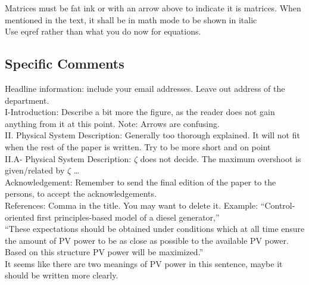 \noindent Matrices must be fat ink or with an arrow above to indicate it is matrices.
When mentioned in the text, it shall be in math mode to be shown in italic \\


\noindent Use eqref rather than what you do now for equations. \\



\subsection{Specific Comments}

\noindent Headline information: include your email addresses.
Leave out address of the department. \\


\noindent I-Introduction: Describe a bit more the figure, as the reader does not gain anything from it at this point. Note: Arrows are confusing. \\


\noindent II. Physical System Description: Generally too thorough explained. It will not fit when the rest of the paper is written. Try to be more short and on point \\


\noindent II.A- Physical System Description: $\zeta$ does not decide. The maximum overshoot is given/related by $\zeta$ … \\


\noindent Acknowledgement: Remember to send the final edition of the paper to the persons, to accept the acknowledgements.\\

\noindent References: Comma in the title. You may want to delete it. 
Example: “Control-oriented first principles-based model of a diesel generator,”\\


\noindent “These expectations should be obtained under conditions which at all time ensure the amount of PV power to be as close as possible to the available PV power. Based on this structure PV power will be maximized.” \\
It seems like there are two meanings of PV power in this sentence, maybe it should be written more clearly.


